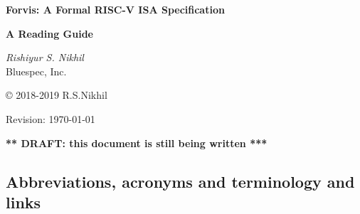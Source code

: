 \documentclass[11pt]{article}
\begin{document}

\pagestyle{empty}

\begin{center}

\vspace*{1.5in}

{\LARGE\bf Forvis: A Formal RISC-V ISA Specification}

\vspace{1cm}

{\large\bf A Reading Guide}

\vspace{2cm}

{\Large \emph{Rishiyur S. Nikhil}} \\

Bluespec, Inc.


\vspace{0.5in}

\copyright{} 2018-2019 R.S.Nikhil

\vspace{1in}

Revision: \today

\vspace{1in}

{\Large\bf *** DRAFT: this document is still being written ***}

\end{center}


\newpage



\subsection*{Abbreviations, acronyms and terminology and links}
\end{document}
